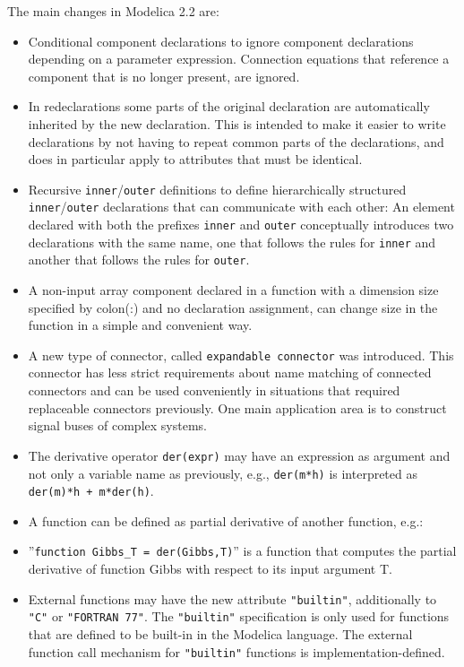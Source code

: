 The main changes in Modelica 2.2 are:
\begin{itemize}
\item
  Conditional component declarations to ignore component declarations
  depending on a parameter expression. Connection equations that
  reference a component that is no longer present, are ignored.
\item
  In redeclarations some parts of the original declaration are
  automatically inherited by the new declaration. This is intended to
  make it easier to write declarations by not having to repeat common
  parts of the declarations, and does in particular apply to attributes
  that must be identical.
\item
  Recursive \lstinline!inner!/\lstinline!outer! definitions to define hierarchically structured
  \lstinline!inner!/\lstinline!outer! declarations that can communicate with each other: An
  element declared with both the prefixes \lstinline!inner! and \lstinline!outer! conceptually
  introduces two declarations with the same name, one that follows the
  rules for \lstinline!inner! and another that follows the rules for \lstinline!outer!.
\item
  A non-input array component declared in a function with a dimension
  size specified by colon(:) and no declaration assignment, can change
  size in the function in a simple and convenient way.
\item
  A new type of connector, called \lstinline!expandable connector! was
  introduced. This connector has less strict requirements about name
  matching of connected connectors and can be used conveniently in
  situations that required replaceable connectors previously. One main
  application area is to construct signal buses of complex systems.
\item
  The derivative operator \lstinline!der(expr)! may have an expression as argument
  and not only a variable name as previously, e.g., \lstinline!der(m*h)! is
  interpreted as \lstinline!der(m)*h + m*der(h)!.
\item
  A function can be defined as partial derivative of another function,
  e.g.:
\item
  ''\lstinline!function Gibbs_T = der(Gibbs,T)!'' is a function that computes the
  partial derivative of function Gibbs with respect to its input
  argument T.
\item
  External functions may have the new attribute \lstinline!"builtin"!, additionally to \lstinline!"C"! or \lstinline!"FORTRAN 77"!.  The \lstinline!"builtin"! specification is only used for functions that are defined to be built-in in the Modelica language.  The external function call mechanism for \lstinline!"builtin"! functions is implementation-defined.
\end{itemize}

